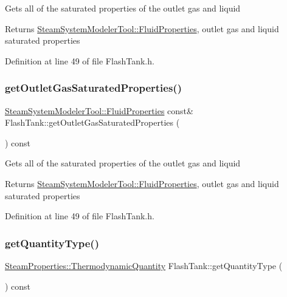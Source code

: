 Gets all of the saturated properties of the outlet gas and liquid \begin{DoxyReturn}{Returns}
\hyperlink{struct_steam_system_modeler_tool_1_1_fluid_properties}{Steam\+System\+Modeler\+Tool\+::\+Fluid\+Properties}, outlet gas and liquid saturated properties 
\end{DoxyReturn}


Definition at line 49 of file Flash\+Tank.\+h.

\mbox{\label{class_flash_tank_a9db00130ed4419e2e251c9e5ce936572}} 
\subsubsection{\texorpdfstring{get\+Outlet\+Gas\+Saturated\+Properties()}{getOutletGasSaturatedProperties()}\hspace{0.1cm}{\footnotesize\ttfamily [3/3]}}
{\footnotesize\ttfamily \hyperlink{struct_steam_system_modeler_tool_1_1_fluid_properties}{Steam\+System\+Modeler\+Tool\+::\+Fluid\+Properties} const\& Flash\+Tank\+::get\+Outlet\+Gas\+Saturated\+Properties (\begin{DoxyParamCaption}{ }\end{DoxyParamCaption}) const\hspace{0.3cm}{\ttfamily [inline]}}

Gets all of the saturated properties of the outlet gas and liquid \begin{DoxyReturn}{Returns}
\hyperlink{struct_steam_system_modeler_tool_1_1_fluid_properties}{Steam\+System\+Modeler\+Tool\+::\+Fluid\+Properties}, outlet gas and liquid saturated properties 
\end{DoxyReturn}


Definition at line 49 of file Flash\+Tank.\+h.

\mbox{\label{class_flash_tank_a1800317a9b9dd8ff8fb18c693e846a45}} 
\subsubsection{\texorpdfstring{get\+Quantity\+Type()}{getQuantityType()}\hspace{0.1cm}{\footnotesize\ttfamily [1/3]}}
{\footnotesize\ttfamily \hyperlink{class_steam_properties_ae0294bedf7d178c2d8fb6aed0f62fbff}{Steam\+Properties\+::\+Thermodynamic\+Quantity} Flash\+Tank\+::get\+Quantity\+Type (\begin{DoxyParamCaption}{ }\end{DoxyParamCaption}) const}


